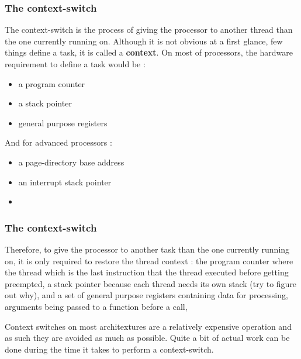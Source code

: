 
\begin{frame}
\frametitle{The context-switch}

The context-switch is the process of giving the processor to another thread than the one currently running on. Although it is not obvious at a first glance, few things define a task, it is called a \textbf{context}. On most of processors, the hardware requirement to define a task would be :

\begin{itemize}
\item
a program counter
\item
a stack pointer
\item
general purpose registers
\end{itemize}

\-

And for advanced processors :

\-

\begin{itemize}
\item
a page-directory base address
\item
an interrupt stack pointer
\item
\etc{}
\end{itemize}

\end{frame}


\begin{frame}
\frametitle{The context-switch}

Therefore, to give the processor to another task than the one currently running on, it is only required to restore the thread context : the program counter where the thread which is the last instruction that the thread executed before getting preempted, a stack pointer because each thread needs its own stack (try to figure out why), and a set of general purpose registers containing data for processing, arguments being passed to a function before a call, \etc{}

\-

Context switches on most architextures are a relatively expensive operation and as such they are avoided as much as possible. Quite a bit of actual work can be done during the time it takes to perform a context-switch.

\end{frame}


